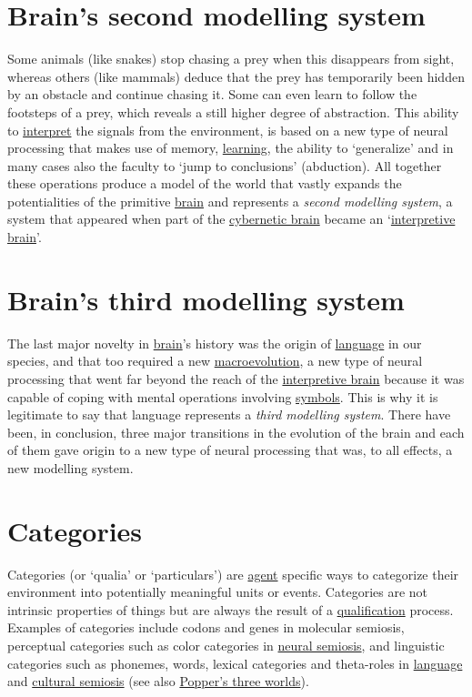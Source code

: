 \documentclass[12pt]{article}
\begin{document}
\hypertarget{brains_second_modelling_system}{}
\section{Brain's second modelling system}
Some animals (like snakes) stop chasing a prey when this disappears from sight, whereas others (like mammals) deduce that the prey has temporarily been hidden by an obstacle and continue chasing it. Some can even learn to follow the footsteps of a prey, which reveals a still higher degree of abstraction. This ability to \hyperlink{interpretation}{interpret} the signals from the environment, is based on a new type of neural processing that makes use of memory, \hyperlink{learning}{learning}, the ability to `generalize' and in many cases also the faculty to `jump to conclusions' (abduction). All together these operations produce a model of the world that vastly expands the potentialities of the primitive \hyperlink{brain}{brain} and represents a \textit{second modelling system}, a system that appeared when part of the \hyperlink{cybernetic_brain}{cybernetic brain} became an `\hyperlink{interpretive_brain}{interpretive brain}'. 


\hypertarget{brains_third_modelling_system}{}
\section{Brain's third modelling system}
The last major novelty in \hyperlink{brain}{brain}'s history was the origin of \hyperlink{language}{language} in our species, and that too required a new \hyperlink{macroevolution}{macroevolution}, a new type of neural processing that went far beyond the reach of the \hyperlink{interpretive_brain}{interpretive brain} because it was capable of coping with mental operations involving \hyperlink{icons_indexes_and_symbols}{symbols}. This is why it is legitimate to say that language represents a \textit{third modelling system}. There have been, in conclusion, three major transitions in the evolution of the brain and each of them gave origin to a new type of neural processing that was, to all effects, a new modelling system. 

\hypertarget{category}{}
\section{Categories}
Categories (or \hypertarget{quantities_qualities_nominables}{`qualia'}
or `particulars') are \hyperlink{agent}{agent} specific ways to
categorize their environment into potentially meaningful units or
events. Categories are not intrinsic properties of things but are
always the result of a \hyperlink{qualification}{qualification}
process. Examples of categories include codons and genes in molecular
semiosis, perceptual categories such as color categories in \hyperlink{neural_semiosis}{neural
semiosis}, and linguistic categories such as phonemes, words, lexical
categories and theta-roles in \hyperlink{language}{language} and
\hyperlink{cultural_semiosis}{cultural semiosis} (see also
\hyperlink{poppers_three_worlds}{Popper's three worlds}).
\end{document}
